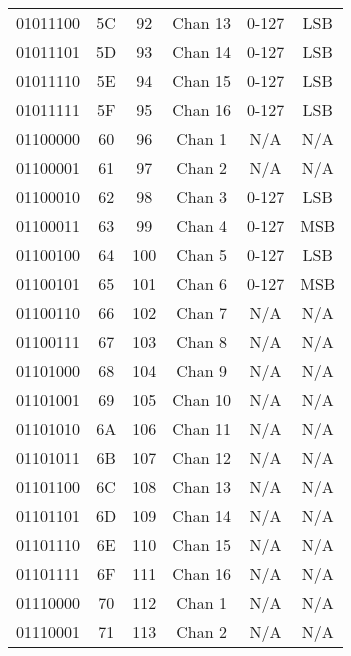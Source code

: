 \begin{center}
\begin{supertabular}{| c | c | c | c | c | c |}
             01011100 & 5C & 92  & Chan 13  & 0-127 & LSB \\
                01011101 & 5D & 93  & Chan 14  & 0-127 & LSB \\
             01011110 & 5E & 94  & Chan 15  & 0-127 & LSB \\
                01011111 & 5F & 95  & Chan 16  & 0-127 & LSB \\
             01100000 & 60 & 96  & Chan 1   & N/A & N/A \\
                01100001 & 61 & 97  & Chan 2   & N/A & N/A \\
             01100010 & 62 & 98  & Chan 3   & 0-127 & LSB \\
                01100011 & 63 & 99  & Chan 4   & 0-127 & MSB \\
             01100100 & 64 & 100 & Chan 5   & 0-127 & LSB \\
                01100101 & 65 & 101 & Chan 6   & 0-127 & MSB \\
             01100110 & 66 & 102 & Chan 7   & N/A & N/A \\
                01100111 & 67 & 103 & Chan 8   & N/A & N/A \\
             01101000 & 68 & 104 & Chan 9   & N/A & N/A \\
                01101001 & 69 & 105 & Chan 10  & N/A & N/A \\
             01101010 & 6A & 106 & Chan 11  & N/A & N/A \\
                01101011 & 6B & 107 & Chan 12  & N/A & N/A \\
             01101100 & 6C & 108 & Chan 13  & N/A & N/A \\
                01101101 & 6D & 109 & Chan 14  & N/A & N/A \\
             01101110 & 6E & 110 & Chan 15  & N/A & N/A \\
                01101111 & 6F & 111 & Chan 16  & N/A & N/A \\
             01110000 & 70 & 112 & Chan 1   & N/A & N/A \\
                01110001 & 71 & 113 & Chan 2   & N/A & N/A \\

\end{supertabular}
\end{center}
